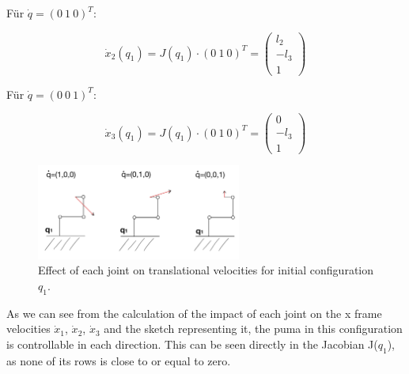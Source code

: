 Für $\dot{q}=(0\ 1\ 0)^T$:

\begin{equation}
    \dot{x}_2(q_1)=J(q_1)\cdot (0\ 1\ 0)^T = \begin{pmatrix} 
  l_2\\
  -l_3\\
  1\end{pmatrix}
\end{equation}

Für $\dot{q}=(0\ 0\ 1)^T$:

\begin{equation}
    \dot{x}_3(q_1)=J(q_1)\cdot (0\ 1\ 0)^T = \begin{pmatrix} 
  0\\
  -l_3\\
  1\end{pmatrix}
\end{equation}


\begin{figure} [H]
   \begin{center}
        \includegraphics[width=0.6\textwidth]{SRC/q_1_joints.JPEG}
   \end{center}
  \caption{Effect of each joint on translational velocities for initial configuration $q_1$.}
  \label{fig:q1}
\end{figure}

As we can see from the calculation of the impact of each joint on the x frame velocities $\dot{x}_1$, $\dot{x}_2$, $\dot{x}_3$ and the sketch representing it, the puma in this configuration is controllable in each direction. This can be seen directly in the Jacobian J($q_1$), as none of its rows is close to or equal to zero. 

